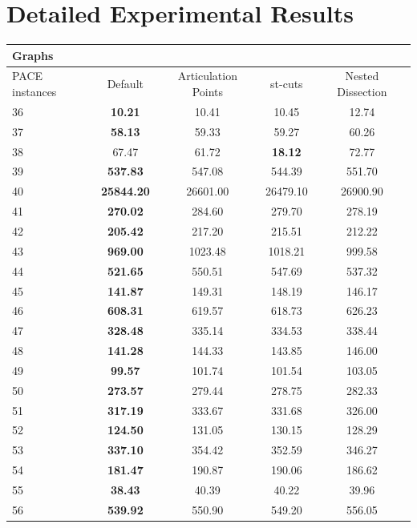 \documentclass[a4paper,UKenglish,cleveref, autoref, thm-restate]{lipics-v2021}
\begin{document}
\newpage
\section{Detailed Experimental Results}
\label{app:detailed_results}
\begin{table}
	\begin{center}
		\begin{tabular}{|l|c|c|c|c|}
			\multicolumn{5}{|l|}{Graphs}\\
			\hline
			PACE instances & Default & Articulation Points & st-cuts & Nested Dissection \\
			\hline
			36 & \textbf{10.21} & 10.41 & 10.45 & 12.74 \\
			37 & \textbf{58.13} & 59.33 & 59.27 & 60.26 \\
			38 & 67.47 & 61.72 & \textbf{18.12} & 72.77 \\
			39 & \textbf{537.83} & 547.08 & 544.39 & 551.70 \\
			40 & \textbf{25844.20} & 26601.00 & 26479.10 & 26900.90 \\
			41 & \textbf{270.02} & 284.60 & 279.70 & 278.19 \\
			42 & \textbf{205.42} & 217.20 & 215.51 & 212.22 \\
			43 & \textbf{969.00} & 1023.48 & 1018.21 & 999.58 \\
			44 & \textbf{521.65} & 550.51 & 547.69 & 537.32 \\
			45 & \textbf{141.87} & 149.31 & 148.19 & 146.17 \\
			46 & \textbf{608.31} & 619.57 & 618.73 & 626.23 \\
			47 & \textbf{328.48} & 335.14 & 334.53 & 338.44 \\
			48 & \textbf{141.28} & 144.33 & 143.85 & 146.00 \\
			49 & \textbf{99.57} & 101.74 & 101.54 & 103.05 \\
			50 & \textbf{273.57} & 279.44 & 278.75 & 282.33 \\
			51 & \textbf{317.19} & 333.67 & 331.68 & 326.00 \\
			52 & \textbf{124.50} & 131.05 & 130.15 & 128.29 \\
			53 & \textbf{337.10} & 354.42 & 352.59 & 346.27 \\
			54 & \textbf{181.47} & 190.87 & 190.06 & 186.62 \\
			55 & \textbf{38.43} & 40.39 & 40.22 & 39.96 \\
			56 & \textbf{539.92} & 550.90 & 549.20 & 556.05 \\

\end{tabular}
\end{center}
\end{table}
\end{document}
